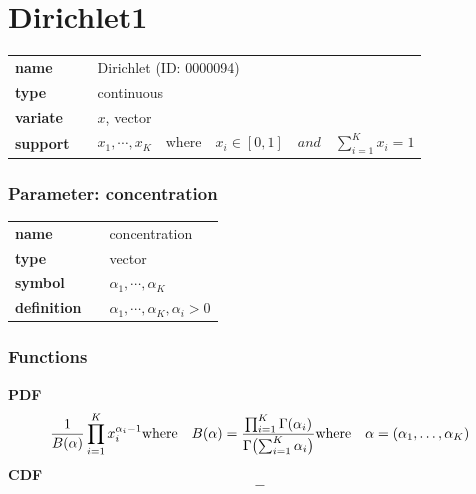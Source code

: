 \section*{Dirichlet1} 

  \bigskip 

\begin{tabular}{p{2cm}cl}
\textbf{name} & & Dirichlet (ID: 0000094)\\ 
 
\textbf{type} & & continuous \\ 

\textbf{variate} & & $x$, vector \\ 

\textbf{support} & & $x_1, \cdots, x_K \quad\text{where}\quad x_i \in [0,1]\quad and \quad\sum_{i=1}^K x_i = 1$
\end{tabular}


\subsubsection*{Parameter: concentration}

\noindent\begin{tabular}{p{2cm}cl}
\textbf{name} & & concentration \\
\textbf{type} & & vector \\
\textbf{symbol} & & $\alpha_1, \cdots, \alpha_K$  \\
\textbf{definition} & & $\alpha_1, \cdots, \alpha_K, \alpha_i > 0$
\end{tabular}
\subsubsection*{Functions}

\smallskip \noindent \hspace{.2cm} \textbf{PDF} 
\begin{equation*}\frac{1}{B(\alpha)} \prod_{i=1}^K x_i^{\alpha_i - 1} \\ \text{where} \quad B(\alpha) = \frac{\prod_{i=1}^K \Gamma(\alpha_i)}{\Gamma\bigl(\sum_{i=1}^K \alpha_i\bigr)} \\ \text{where} \quad \alpha=(\alpha_1,\ldots,\alpha_K)\end{equation*}
\smallskip \noindent \hspace{.2cm} \textbf{CDF} 
\begin{equation*}-\end{equation*}
\smallskip
